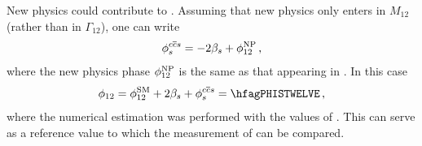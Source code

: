 New physics could contribute to \phiccbars. Assuming that new physics only 
enters in $M_{12}$ (rather than in $\Gamma_{12}$),
one can write~\cite{Lenz:2011ti,*Lenz:2006hd}
\begin{equation}
\phiccbars = -  2\beta_s + \phi_{12}^{\rm NP} \,,
\end{equation}
where the new physics phase $\phi_{12}^{\rm NP}$ is the same as that appearing in .
In this case
\begin{equation}
\phi_{12} = %
\phi_{12}^{\rm SM} +2\beta_s + \phiccbars = \hfagPHISTWELVE \,,
\end{equation}
where the numerical estimation was performed with the values of .
This can serve as a reference value to which the measurement of  can be compared. 



%

